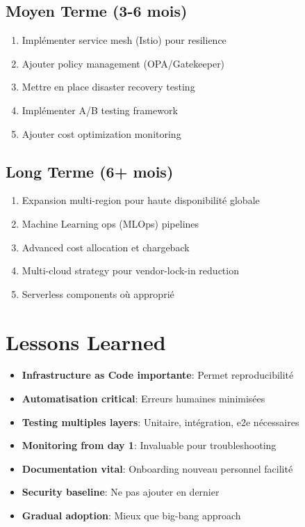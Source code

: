 \documentclass[12pt,a4paper]{report}
\begin{document}
\subsection{Moyen Terme (3-6 mois)}

\begin{enumerate}
    \item Implémenter service mesh (Istio) pour resilience
    \item Ajouter policy management (OPA/Gatekeeper)
    \item Mettre en place disaster recovery testing
    \item Implémenter A/B testing framework
    \item Ajouter cost optimization monitoring
\end{enumerate}

\subsection{Long Terme (6+ mois)}

\begin{enumerate}
    \item Expansion multi-region pour haute disponibilité globale
    \item Machine Learning ops (MLOps) pipelines
    \item Advanced cost allocation et chargeback
    \item Multi-cloud strategy pour vendor-lock-in reduction
    \item Serverless components où approprié
\end{enumerate}

\section{Lessons Learned}

\begin{itemize}
    \item \textbf{Infrastructure as Code importante}: Permet reproducibilité
    \item \textbf{Automatisation critical}: Erreurs humaines minimisées
    \item \textbf{Testing multiples layers}: Unitaire, intégration, e2e nécessaires
    \item \textbf{Monitoring from day 1}: Invaluable pour troubleshooting
    \item \textbf{Documentation vital}: Onboarding nouveau personnel facilité
    \item \textbf{Security baseline}: Ne pas ajouter en dernier
    \item \textbf{Gradual adoption}: Mieux que big-bang approach
\end{itemize}
\end{document}
